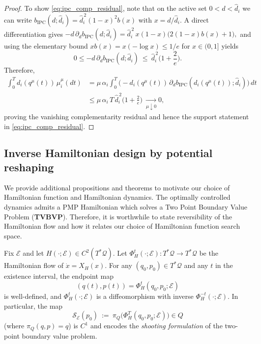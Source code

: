 \begin{proof}
To show \cref{eq:ipc_comp_residual}, note that on the active set $0<d<\hat d_i$ we can write
$b_{\mathrm{IPC}}(d;\hat d_i)=\hat d_i^{\,2}(1-x)^2b(x)$ with $x=d/\hat d_i$.
A direct differentiation gives
\(
-d\,\partial_d b_{\mathrm{IPC}}(d;\hat d_i)
=
\hat d_i^{\,2}\,x(1-x)\big(2(1-x)b(x)+1\big),
\)
and using the elementary bound $xb(x)=x(-\log x)\le 1/e$ for $x\in(0,1]$ yields
\[
0\le -d\,\partial_d b_{\mathrm{IPC}}(d;\hat d_i)\ \le\ \hat d_i^{\,2}\Big(1+\frac{2}{e}\Big).
\]
Therefore,
\begin{equation}
\begin{aligned}
\int_0^T d_i(q^\mu(t))\,\mu_i^\mu(dt)
&= \mu\,\alpha_i\int_0^T \Big(-d_i(q^\mu(t))\,\partial_d b_{\mathrm{IPC}}(d_i(q^\mu(t));\hat d_i)\Big)\,dt \\
&\leq \mu\,\alpha_i\,T\,\hat d_i^{\,2}\Big(1+\frac{2}{e}\Big)\ \xrightarrow[\mu\downarrow 0]{} 0,        
\end{aligned}
\end{equation}
proving the vanishing complementarity residual and hence the support statement in \cref{eq:ipc_comp_residual}.
\end{proof}




\subsection{Inverse Hamiltonian design by potential reshaping}
\label{app:inverse_design}


We provide additional propositions and theorems to motivate our choice of Hamiltonian function and Hamiltonian dynamics. The optimally controlled dynamics admits a PMP Hamiltonian which solves a Two Point Boundary Value Problem (\textbf{TVBVP}). Therefore, it is worthwhile to state reversibility of the Hamiltonian flow and how it relates our choice of Hamiltonian function search space.

\begin{proposition}
\label{lem:symplectic_flow_shooting}
Fix $\mathcal E$ and let $H(\cdot;\mathcal E)\in C^2(T^{*}\mathcal{Q})$.
Let $\Phi_H^t(\cdot;\mathcal E):T^{*}\mathcal{Q}\to T^{*}\mathcal{Q}$ be the Hamiltonian flow of $\dot x=X_H(x)$.
For any $(q_0,p_0)\in T^{*}{\mathcal{Q}}$ and any $t$ in the existence interval, the endpoint map
\[
(q(t),p(t))=\Phi_H^t(q_0,p_0;\mathcal E)
\]
is well-defined, and $\Phi_H^t(\cdot;\mathcal E)$ is a diffeomorphism with inverse $\Phi_H^{-t}(\cdot;\mathcal E)$.
In particular, the map
\[
\mathcal S_{\mathcal E}(p_0)\ :=\ \pi_Q\!\big(\Phi_H^{T}(q_0,p_0;\mathcal E)\big)\in Q
\]
(where $\pi_Q(q,p)=q$) is $C^1$ and encodes the \emph{shooting formulation} of the two-point boundary value problem.
\end{proposition}

